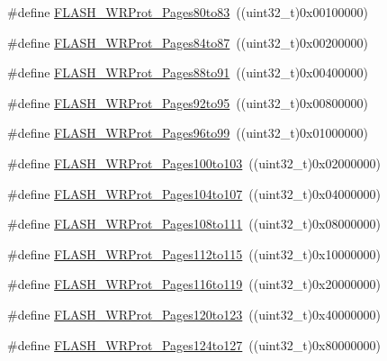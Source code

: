 \begin{DoxyCompactItemize}
\#define \mbox{\hyperlink{group___option___bytes___write___protection_ga5749428874f99f77a5c5fc48a88816d9}{F\+L\+A\+S\+H\+\_\+\+W\+R\+Prot\+\_\+\+Pages80to83}}~((uint32\+\_\+t)0x00100000)
\item 
\#define \mbox{\hyperlink{group___option___bytes___write___protection_ga9dbf7aeb5b54b42f9b345c95d00eaf32}{F\+L\+A\+S\+H\+\_\+\+W\+R\+Prot\+\_\+\+Pages84to87}}~((uint32\+\_\+t)0x00200000)
\item 
\#define \mbox{\hyperlink{group___option___bytes___write___protection_gaeece6aa5e198239067c47f678b9d015e}{F\+L\+A\+S\+H\+\_\+\+W\+R\+Prot\+\_\+\+Pages88to91}}~((uint32\+\_\+t)0x00400000)
\item 
\#define \mbox{\hyperlink{group___option___bytes___write___protection_gab7d95c1f574523ef827bafd01a64b0bb}{F\+L\+A\+S\+H\+\_\+\+W\+R\+Prot\+\_\+\+Pages92to95}}~((uint32\+\_\+t)0x00800000)
\item 
\#define \mbox{\hyperlink{group___option___bytes___write___protection_ga8f3ea488c33b3e209cab996545f55c49}{F\+L\+A\+S\+H\+\_\+\+W\+R\+Prot\+\_\+\+Pages96to99}}~((uint32\+\_\+t)0x01000000)
\item 
\#define \mbox{\hyperlink{group___option___bytes___write___protection_ga0c03cee6931c623ccdaae19233c81f4e}{F\+L\+A\+S\+H\+\_\+\+W\+R\+Prot\+\_\+\+Pages100to103}}~((uint32\+\_\+t)0x02000000)
\item 
\#define \mbox{\hyperlink{group___option___bytes___write___protection_ga2e096d51e61a972c97093110211b3be5}{F\+L\+A\+S\+H\+\_\+\+W\+R\+Prot\+\_\+\+Pages104to107}}~((uint32\+\_\+t)0x04000000)
\item 
\#define \mbox{\hyperlink{group___option___bytes___write___protection_ga899e34df1ab5369d840461686eb9c318}{F\+L\+A\+S\+H\+\_\+\+W\+R\+Prot\+\_\+\+Pages108to111}}~((uint32\+\_\+t)0x08000000)
\item 
\#define \mbox{\hyperlink{group___option___bytes___write___protection_gacd2d5839240b77f70be15e76086745ab}{F\+L\+A\+S\+H\+\_\+\+W\+R\+Prot\+\_\+\+Pages112to115}}~((uint32\+\_\+t)0x10000000)
\item 
\#define \mbox{\hyperlink{group___option___bytes___write___protection_ga1283655c7c974e0de142cec7921c8673}{F\+L\+A\+S\+H\+\_\+\+W\+R\+Prot\+\_\+\+Pages116to119}}~((uint32\+\_\+t)0x20000000)
\item 
\#define \mbox{\hyperlink{group___option___bytes___write___protection_gac8d2f42123810fefc68572709d8830ec}{F\+L\+A\+S\+H\+\_\+\+W\+R\+Prot\+\_\+\+Pages120to123}}~((uint32\+\_\+t)0x40000000)
\item 
\#define \mbox{\hyperlink{group___option___bytes___write___protection_gae6e70db5200b52248c9ec4293ff9890e}{F\+L\+A\+S\+H\+\_\+\+W\+R\+Prot\+\_\+\+Pages124to127}}~((uint32\+\_\+t)0x80000000)

\end{DoxyCompactItemize}
